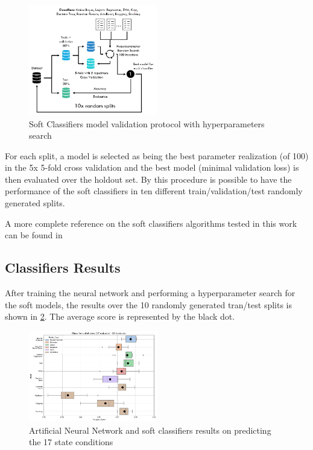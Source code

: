 \documentclass[twocolumn]{article}
\begin{document}
\begin{figure}[H]
      \centering
      \includegraphics[width=0.5\textwidth]{soft_model_protocol.png}
      \caption{Soft Classifiers model validation protocol with hyperparameters search}
      \label{fig:soft_model_protocol}
\end{figure}

For each split, a model is selected as being the best parameter realization (of 100) in the 5x 5-fold cross validation and the best model (minimal validation loss) is then evaluated over the holdout set. By this procedure is possible to have the performance of the soft classifiers in ten different train/validation/test randomly generated splits.

A more complete reference on the soft classifiers algorithms tested in this work can be found in \cite{geron2017hands-on}



\subsection{Classifiers Results}

After training the neural network and performing a hyperparameter search for the soft models, the results over the 10 randomly generated tran/test splits is shown in \ref*{fig:results}. The average score is represented by the black dot.

\begin{figure}[H]
      \centering
      \includegraphics[width=0.5\textwidth]{results.png}
      \caption{Artificial Neural Network and soft classifiers results on predicting the 17 state conditions}
      \label{fig:results}
\end{figure}
\end{document}
